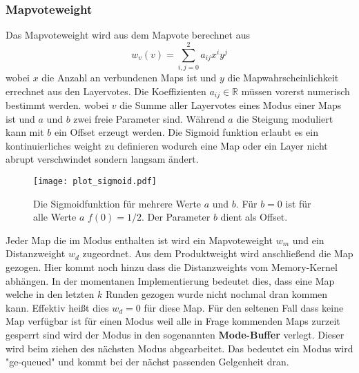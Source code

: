         \subsubsection{Mapvoteweight}
            Das Mapvoteweight wird aus dem Mapvote berechnet aus 
            \begin{equation}
                w_v(v) = \sum_{i,j = 0}^2 a_{ij}x^i y^j
            \end{equation}
            wobei $x$ die Anzahl an verbundenen Maps ist und $y$ die Mapwahrscheinlichkeit errechnet aus den Layervotes.
            Die Koeffizienten $a_{ij}\in\mathbb{R}$ müssen vorerst numerisch bestimmt werden.  
            wobei $v$ die Summe aller Layervotes eines Modus einer Maps ist und $a$ und $b$ zwei freie Parameter sind.
            Während $a$ die Steigung moduliert kann mit $b$ ein Offset erzeugt werden.
            Die Sigmoid funktion erlaubt es ein kontinuierliches weight zu definieren wodurch eine Map oder ein Layer nicht abrupt verschwindet sondern langsam ändert.
            \begin{figure}[htbp]
                \centering
                \texttt{[image: plot\_sigmoid.pdf]}
                \caption{Die Sigmoidfunktion für mehrere Werte $a$ und $b$. 
                            Für $b=0$ ist für alle Werte $a$ $f(0)=1/2$.
                            Der Parameter $b$ dient als Offset.}
            \end{figure}
    Jeder Map die im Modus enthalten ist wird ein Mapvoteweight $w_m$ und ein Distanzweight $w_d$ zugeordnet. 
    Aus dem Produktweight wird anschließend die Map gezogen. 
    Hier kommt noch hinzu dass die Distanzweights vom Memory-Kernel abhängen. 
    In der momentanen Implementierung bedeutet dies, dass eine Map welche in den letzten $k$ Runden gezogen wurde nicht nochmal dran kommen kann. 
    Effektiv heißt dies $w_d=0$ für diese Map. 
    Für den seltenen Fall dass keine Map verfügbar ist für einen Modus weil alle in Frage kommenden Maps zurzeit gesperrt sind wird der Modus in den sogenannten \textbf{Mode-Buffer} verlegt. 
    Dieser wird beim ziehen des nächsten Modus abgearbeitet. 
    Das bedeutet ein Modus wird "ge-queued" und kommt bei der nächst passenden Gelgenheit dran. 
    
